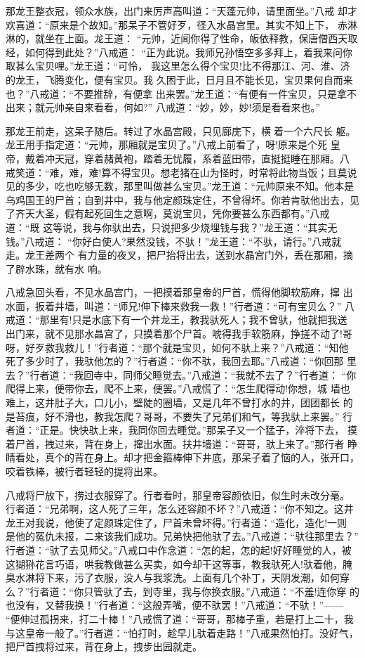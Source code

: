 那龙王整衣冠，领众水族，出门来厉声高叫道：“天蓬元帅，请里面坐。”八戒
却才欢喜道：“原来是个故知。”那呆子不管好歹，径入水晶宫里。其实不知上下，
赤淋淋的，就坐在上面。龙王道：
“元帅，近闻你得了性命，皈依释教，保唐僧西天取经，如何得到此处？”八戒道：
“正为此说。我师兄孙悟空多多拜上，着我来问你取甚么宝贝哩。”龙王道：“可怜，
我这里怎么得个宝贝!比不得那江、河、淮、济的龙王，飞腾变化，便有宝贝。我
久困于此，日月且不能长见，宝贝果何自而来也？”八戒道：“不要推辞，有便拿
出来罢。”龙王道：“有便有一件宝贝，只是拿不出来；就元帅亲自来看看，何如?”
八戒道：“妙，妙，妙!须是看看来也。”

那龙王前走，这呆子随后。转过了水晶宫殿，只见廊庑下，横着一个六尺长
躯。龙王用手指定道：“元帅，那厢就是宝贝了。”八戒上前看了，呀!原来是个死
皇帝，戴着冲天冠，穿着赭黄袍，踏着无忧履，系着蓝田带，直挺挺睡在那厢。八
戒笑道：“难，难，难!算不得宝贝。想老猪在山为怪时，时常将此物当饭；且莫说
见的多少，吃也吃够无数，那里叫做甚么宝贝。”龙王道：“元帅原来不知。他本是
乌鸡国王的尸首；自到井中，我与他定颜珠定住，不曾得坏。你若肯驮他出去，见
了齐天大圣，假有起死回生之意啊，莫说宝贝，凭你要甚么东西都有。”八戒道：“既
这等说，我与你驮出去，只说把多少烧埋钱与我？”龙王道：“其实无钱。”八戒道：
“你好白使人?果然没钱，不驮！”龙王道：“不驮，请行。”八戒就走。龙王差两个
有力量的夜叉，把尸抬将出去，送到水晶宫门外，丢在那厢，摘了辟水珠，就有水
响。

八戒急回头看，不见水晶宫门，一把摸着那皇帝的尸首，慌得他脚软筋麻，撺
出水面，扳着井墙，叫道：“师兄!伸下棒来救我一救！”行者道：“可有宝贝么？”
八戒道：“那里有!只是水底下有一个井龙王，教我驮死人；我不曾驮，他就把我送
出门来，就不见那水晶宫了，只摸着那个尸首。唬得我手软筋麻，挣搓不动了!哥
呀，好歹救我救儿！”行者道：“那个就是宝贝，如何不驮上来？”八戒道：“知他
死了多少时了，我驮他怎的？”行者道：“你不驮，我回去耶。”八戒道：“你回那
里去？”行者道：“我回寺中，同师父睡觉去。”八戒道：“我就不去了？”行者道：
“你爬得上来，便带你去，爬不上来，便罢。”八戒慌了：“怎生爬得动!你想，城
墙也难上，这井肚子大，口儿小，壁陡的圈墙，又是几年不曾打水的井，团团都长
的是苔痕，好不滑也，教我怎爬？哥哥，不要失了兄弟们和气，等我驮上来罢。”
行者道：“正是。快快驮上来，我同你回去睡觉。”那呆子又一个猛子，淬将下去，
摸着尸首，拽过来，背在身上，撺出水面。扶井墙道：“哥哥，驮上来了。”那行者
睁睛看处，真个的背在身上。却才把金箍棒伸下井底，那呆子着了恼的人，张开口，
咬着铁棒，被行者轻轻的提将出来。

八戒将尸放下，捞过衣服穿了。行者看时，那皇帝容颜依旧，似生时未改分毫。
行者道：“兄弟啊，这人死了三年，怎么还容颜不坏？”八戒道：“你不知之。这井
龙王对我说，他使了定颜珠定住了，尸首未曾坏得。”行者道：“造化，造化!一则
是他的冤仇未报，二来该我们成功。兄弟快把他驮了去。”八戒道：“驮往那里去？”
行者道：“驮了去见师父。”八戒口中作念道：“怎的起，怎的起!好好睡觉的人，被
这猢狲花言巧语，哄我教做甚么买卖，如今却干这等事，教我驮死人!驮着他，腌
臭水淋将下来，污了衣服，没人与我浆洗。上面有几个补丁，天阴发潮，如何穿
么？”行者道：“你只管驮了去，到寺里，我与你换衣服。”八戒道：“不羞!连你穿
的也没有，又替我换！”行者道：“这般弄嘴，便不驮罢！”八戒道：“不驮！”——
“便伸过孤拐来，打二十棒！”八戒慌了道：“哥哥，那棒子重，若是打上二十，我
与这皇帝一般了。”行者道：“怕打时，趁早儿驮着走路！”八戒果然怕打。没好气，
把尸首拽将过来，背在身上，拽步出园就走。

